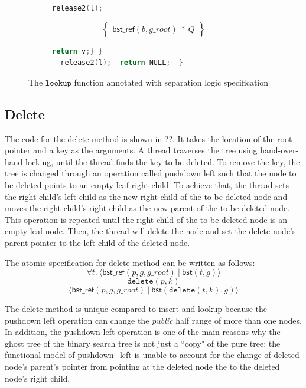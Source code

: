 \documentclass[a4paper,USenglish,cleveref, autoref, thm-restate]{lipics-v2021}
\newcommand{\treerep}{\ensuremath{\mathsf{bst}}}
\newcommand{\nodeboxrep}{\ensuremath{\mathsf{bst\_ref}}}
\begin{document}
\begin{figure}[htp]
\begin{subfigure}[t]{1\textwidth}
        \begin{lstlisting}[language = C,  numbers = none]
      release2(l);
         \end{lstlisting}
       $$\left\{\begin{array}{l} \nodeboxrep(b,g\_root)\ *\ Q\end{array}\right\}$$
         \begin{lstlisting}[language = C, numbers = none]
       return v;} }
  release2(l);  return NULL;  }
 \end{lstlisting} 
\end{subfigure}
\caption{The $\texttt{lookup}$ function annotated with separation logic specification}
\label{lookupproof}
\end{figure} 

\subsection{Delete}

The code for the delete method is shown in ??. It takes the location of the root pointer
and a key as the arguments. A thread traverses the tree using hand-over-hand locking,
until the thread finds the key to be deleted. To remove the key, the tree is changed 
through an operation called pushdown left such that the node to be deleted points to an empty leaf
right child. To achieve that, the thread sets the right child's left child as the 
new right child of the to-be-deleted node and moves the right child's right child as 
the new parent of the to-be-deleted node. This operation is repeated until the right
child of the to-be-deleted node is an empty leaf node. Then, the thread will delete
the node and set the delete node's parent pointer to the left child of the deleted node.

The atomic specification for delete method can be written as follows:
$$\forall t.\ \langle \nodeboxrep(p,g,g\_root)\ |\ \treerep(t,g)\rangle $$ 
$$\texttt{delete}(p,k)$$
$$\langle \nodeboxrep(p,g,g\_root)\ |\ \treerep(\texttt{delete}(t, k),g)\rangle $$

The delete method is unique compared to insert and lookup because the pushdown left 
operation can change the \textit{public} half range of more than one nodes. In addition,
the pushdown left operation is one of the main reasons why the ghost tree of the binary
search tree is not just a ``copy" of the pure tree: the functional model of pushdown\_left
is unable to account for the change of deleted node's parent's pointer from pointing
at the deleted node the to the deleted node's right child.
\end{document}

